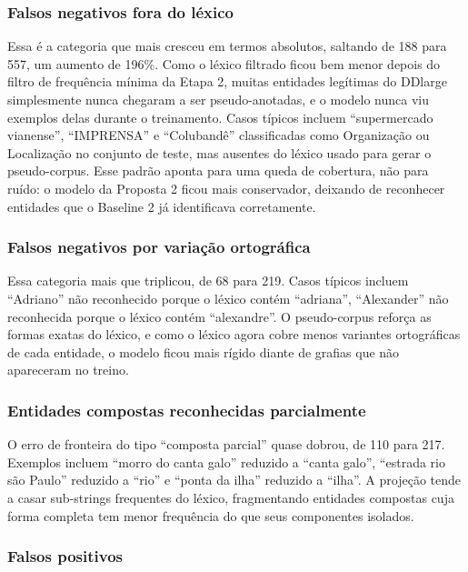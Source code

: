 \documentclass[12pt,a4paper]{article}
\begin{document}
\subsubsection{Falsos negativos fora do léxico}

Essa é a categoria que mais cresceu em termos absolutos, saltando de 188 para
557, um aumento de 196\%. Como o léxico filtrado ficou bem menor depois do
filtro de frequência mínima da Etapa 2, muitas entidades legítimas do DDlarge
simplesmente nunca chegaram a ser pseudo-anotadas, e o modelo nunca viu
exemplos delas durante o treinamento. Casos típicos incluem ``supermercado
vianense'', ``IMPRENSA'' e ``Colubandê'' classificadas como Organização ou
Localização no conjunto de teste, mas ausentes do léxico usado para gerar o
pseudo-corpus. Esse padrão aponta para uma queda de cobertura, não para ruído:
o modelo da Proposta 2 ficou mais conservador, deixando de reconhecer
entidades que o Baseline 2 já identificava corretamente.

\subsubsection{Falsos negativos por variação ortográfica}

Essa categoria mais que triplicou, de 68 para 219. Casos típicos incluem
``Adriano'' não reconhecido porque o léxico contém ``adriana'', ``Alexander''
não reconhecida porque o léxico contém ``alexandre''. O pseudo-corpus reforça as
formas exatas do léxico, e como o léxico agora cobre menos variantes
ortográficas de cada entidade, o modelo ficou mais rígido diante de grafias
que não apareceram no treino.

\subsubsection{Entidades compostas reconhecidas parcialmente}

O erro de fronteira do tipo ``composta parcial'' quase dobrou, de 110 para
217. Exemplos incluem ``morro do canta galo'' reduzido a ``canta galo'',
``estrada rio são Paulo'' reduzido a ``rio'' e ``ponta da ilha'' reduzido a
``ilha''. A projeção tende a casar sub-strings frequentes do léxico,
fragmentando entidades compostas cuja forma completa tem menor frequência do
que seus componentes isolados.

\subsubsection{Falsos positivos}
\end{document}
